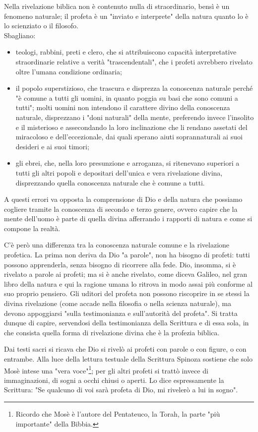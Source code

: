 Nella rivelazione biblica non è contenuto nulla di straordinario, bensì è un fenomeno naturale; il profeta è un "inviato e interprete" della natura quanto lo è lo scienziato o il filosofo.\\
Sbagliano: 
\begin{itemize}
	\item teologi,
	rabbini, preti e clero, che si attribuiscono capacità interpretative straordinarie relative a verità "trascendentali", che i profeti avrebbero rivelato oltre l'umana condizione ordinaria;
	\item il popolo superstizioso, che trascura e disprezza la conoscenza naturale perché "è comune a tutti gli uomini, in
	quanto poggia su basi che sono comuni a tutti"; molti uomini non intendono il carattere divino della
	conoscenza naturale, disprezzano i "doni naturali"
	della mente, preferendo invece l'insolito e il misterioso e assecondando la loro inclinazione 
	che li rendano assetati del miracoloso e dell'eccezionale, dai quali sperano aiuti soprannaturali ai suoi
	desideri e ai suoi timori;
	\item gli ebrei, che, nella loro presunzione e
	arroganza, si ritenevano superiori a tutti gli altri popoli e depositari dell'unica e vera rivelazione
	divina, disprezzando quella conoscenza naturale che è comune a tutti.
\end{itemize}

A questi errori va opposta la comprensione di Dio e della natura che possiamo cogliere tramite la conoscenza di secondo e terzo genere, ovvero capire che la mente dell'uomo è parte di quella divina afferrando i rapporti di natura e come si compone la realtà.

C'è però una differenza tra la conoscenza naturale comune e la rivelazione profetica. La prima non
deriva da Dio "a parole", non ha bisogno di profeti: tutti
possono apprenderla, senza bisogno di ricorrere alla fede. Dio, insomma, si è rivelato a parole ai profeti; ma si è anche rivelato, come diceva
Galileo, nel gran libro della natura e qui la ragione umana lo ritrova in modo assai più conforme
al suo proprio pensiero. Gli
uditori del profeta non possono riscoprire in se stessi la divina rivelazione (come accade nella
filosofia o nella scienza naturale), ma devono appoggiarsi "sulla testimonianza e sull'autorità del
profeta". Si tratta dunque di capire, servendosi della testimonianza della Scrittura e di essa sola, in
che consista quella forma di rivelazione divina che è la profezia biblica.

Dai testi sacri si ricava che Dio si rivelò ai profeti con parole o con figure, o con entrambe. Alla luce della lettura testuale della Scrittura
Spinoza sostiene che solo Mosè intese una "vera voce"\footnote{Ricordo che Mosè è l'autore del Pentateuco, la Torah, la parte "più importante" della Bibbia.}; per gli altri profeti  si trattò invece di immaginazioni, di sogni a occhi chiusi o aperti. Lo dice espressamente
la Scrittura: "Se qualcuno di voi sarà profeta di Dio, mi rivelerò a lui in sogno". 


